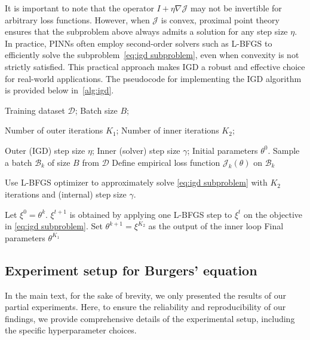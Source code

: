 \documentclass{article}
\begin{document}
It is important to note that the operator $I + \eta \nabla \mathcal{J}$ may not be invertible for arbitrary loss functions.  
However, when $\mathcal{J}$ is convex, proximal point theory ensures that the subproblem above always admits a solution for any step size $\eta$.  
In practice, PINNs often employ second-order solvers such as L-BFGS to efficiently solve the subproblem~\cref{eq:igd subproblem}, even when convexity is not strictly satisfied.  
This practical approach makes IGD a robust and effective choice for real-world applications.  
The pseudocode for implementing the IGD algorithm is provided below in~\cref{alg:igd}.
\begin{algorithm}
\caption{Mini-batch implicit gradient descent (IGD)\label{alg:igd}}
\begin{algorithmic}[1]

   \quad Training dataset $\mathcal{D}$;
   Batch size $B$;

   \quad Number of outer iterations $K_1$;
   Number of inner iterations $K_2$;
   
   \quad Outer (IGD) step size $\eta$;
   Inner (solver) step size $\gamma$;
   Initial parameters $\theta^0$.
        \STATE Sample a batch $\mathcal{B}_k$ of size $B$ from $\mathcal{D}$
        \STATE Define empirical loss function $\mathcal{J}_k(\theta)$ on $\mathcal{B}_k$
        
        Use L-BFGS optimizer to approximately solve \cref{eq:igd subproblem} with $K_2$ iterations and (internal) step size $\gamma$.

        Let $\xi^0 =\theta^k$.
                \STATE $\xi^{t+1}$ is obtained by applying one L-BFGS step to $\xi^t$ on the objective in \cref{eq:igd subproblem}.
            \ENDFOR
        \STATE Set $\theta^{k+1}=\xi^{K_2}$ as the output of the inner loop
    \ENDFOR
     Final parameters $\theta^{K_1}$
\end{algorithmic}
\end{algorithm}

\subsection{Experiment setup for Burgers' equation}\label{sec:setup burgers}
In the main text, for the sake of brevity, we only presented the results of our partial experiments. %
Here, to ensure the reliability and reproducibility of our findings, we provide comprehensive details of the experimental setup, including the specific hyperparameter choices.  
\end{document}

